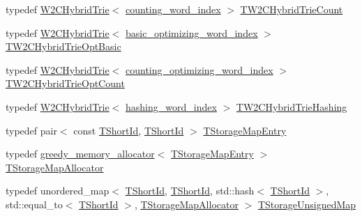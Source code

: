 \begin{DoxyCompactItemize}
\item 
typedef \hyperlink{classuva_1_1smt_1_1bpbd_1_1server_1_1lm_1_1_w2_c_hybrid_trie}{W2\+C\+Hybrid\+Trie}$<$ \hyperlink{classuva_1_1smt_1_1bpbd_1_1server_1_1lm_1_1dictionary_1_1counting__word__index}{counting\+\_\+word\+\_\+index} $>$ \hyperlink{namespaceuva_1_1smt_1_1bpbd_1_1server_1_1lm_a0e46e4f0c25b1f6e07cbb2854f69beb8}{T\+W2\+C\+Hybrid\+Trie\+Count}
\item 
typedef \hyperlink{classuva_1_1smt_1_1bpbd_1_1server_1_1lm_1_1_w2_c_hybrid_trie}{W2\+C\+Hybrid\+Trie}$<$ \hyperlink{namespaceuva_1_1smt_1_1bpbd_1_1server_1_1lm_1_1dictionary_a3001583c904eec702b4a4125082a7ecd}{basic\+\_\+optimizing\+\_\+word\+\_\+index} $>$ \hyperlink{namespaceuva_1_1smt_1_1bpbd_1_1server_1_1lm_a092da1a25cd6887e951a66d3f4983b51}{T\+W2\+C\+Hybrid\+Trie\+Opt\+Basic}
\item 
typedef \hyperlink{classuva_1_1smt_1_1bpbd_1_1server_1_1lm_1_1_w2_c_hybrid_trie}{W2\+C\+Hybrid\+Trie}$<$ \hyperlink{namespaceuva_1_1smt_1_1bpbd_1_1server_1_1lm_1_1dictionary_a61cbd647b15de785ccf4cdd26661c366}{counting\+\_\+optimizing\+\_\+word\+\_\+index} $>$ \hyperlink{namespaceuva_1_1smt_1_1bpbd_1_1server_1_1lm_a5f23b61f755456ea49e9ec0eed15eb93}{T\+W2\+C\+Hybrid\+Trie\+Opt\+Count}
\item 
typedef \hyperlink{classuva_1_1smt_1_1bpbd_1_1server_1_1lm_1_1_w2_c_hybrid_trie}{W2\+C\+Hybrid\+Trie}$<$ \hyperlink{classuva_1_1smt_1_1bpbd_1_1server_1_1lm_1_1dictionary_1_1hashing__word__index}{hashing\+\_\+word\+\_\+index} $>$ \hyperlink{namespaceuva_1_1smt_1_1bpbd_1_1server_1_1lm_aa2818fd447c1e13a07ae1c4e43bac187}{T\+W2\+C\+Hybrid\+Trie\+Hashing}
\item 
typedef pair$<$ const \hyperlink{namespaceuva_1_1smt_1_1bpbd_1_1server_1_1lm_1_1identifiers_a33043a191e9a637dea742a89d23c8bdc}{T\+Short\+Id}, \hyperlink{namespaceuva_1_1smt_1_1bpbd_1_1server_1_1lm_1_1identifiers_a33043a191e9a637dea742a89d23c8bdc}{T\+Short\+Id} $>$ \hyperlink{namespaceuva_1_1smt_1_1bpbd_1_1server_1_1lm_af9753207e699d2eca15673a50653797e}{T\+Storage\+Map\+Entry}
\item 
typedef \hyperlink{classuva_1_1utils_1_1containers_1_1alloc_1_1greedy__memory__allocator}{greedy\+\_\+memory\+\_\+allocator}$<$ \hyperlink{namespaceuva_1_1smt_1_1bpbd_1_1server_1_1lm_af9753207e699d2eca15673a50653797e}{T\+Storage\+Map\+Entry} $>$ \hyperlink{namespaceuva_1_1smt_1_1bpbd_1_1server_1_1lm_a70b67dc80579cc0df5e9509d40b2563a}{T\+Storage\+Map\+Allocator}
\item 
typedef unordered\+\_\+map$<$ \hyperlink{namespaceuva_1_1smt_1_1bpbd_1_1server_1_1lm_1_1identifiers_a33043a191e9a637dea742a89d23c8bdc}{T\+Short\+Id}, \hyperlink{namespaceuva_1_1smt_1_1bpbd_1_1server_1_1lm_1_1identifiers_a33043a191e9a637dea742a89d23c8bdc}{T\+Short\+Id}, std\+::hash$<$ \hyperlink{namespaceuva_1_1smt_1_1bpbd_1_1server_1_1lm_1_1identifiers_a33043a191e9a637dea742a89d23c8bdc}{T\+Short\+Id} $>$, std\+::equal\+\_\+to$<$ \hyperlink{namespaceuva_1_1smt_1_1bpbd_1_1server_1_1lm_1_1identifiers_a33043a191e9a637dea742a89d23c8bdc}{T\+Short\+Id} $>$, \hyperlink{namespaceuva_1_1smt_1_1bpbd_1_1server_1_1lm_a70b67dc80579cc0df5e9509d40b2563a}{T\+Storage\+Map\+Allocator} $>$ \hyperlink{namespaceuva_1_1smt_1_1bpbd_1_1server_1_1lm_a26bc64a9a6f92c48c443c82b33035e60}{T\+Storage\+Unsigned\+Map}

\end{DoxyCompactItemize}

